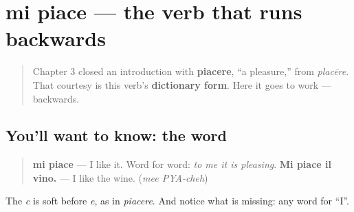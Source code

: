 \section[mi piace]{mi piace — the verb that runs backwards}

\label{lesson:IT-C19-mi-piace}



\begin{quote}
Chapter 3 closed an introduction with \textbf{piacere}, \textquotedblleft{}a pleasure,\textquotedblright{} from \emph{placēre}. That courtesy is this verb's \textbf{dictionary form}. Here it goes to work — backwards.
\end{quote}

\subsection*{You'll want to know: the word}
\begin{quote}
\textbf{mi piace} — I like it. Word for word: \emph{to me it is pleasing}. \textbf{Mi piace il vino.} — I like the wine. (\emph{mee PYA-cheh})
\end{quote}

The \emph{c} is soft before \emph{e}, as in \emph{piacere}. And notice what is missing: any word for \textquotedblleft{}I\textquotedblright{}.

